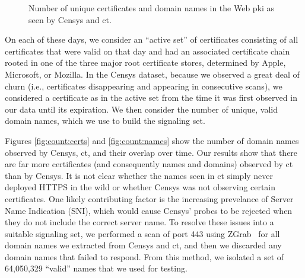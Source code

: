 \begin{figure}
  \centering
  \caption{Number of unique certificates and domain names in the Web \ac{pki} as seen by
  Censys and \ac{ct}.}
  \label{fig:count}
\end{figure}

On each of these days, we consider an ``active set'' of certificates consisting
of all certificates that were valid on that day and had an associated
certificate chain rooted in one of the three major root certificate stores,
determined by Apple, Microsoft, or Mozilla. In the Censys dataset, because we
observed a great deal of churn (i.e., certificates disappearing and appearing in
consecutive scans), we considered a certificate as in the active set from the
time it was first observed in our data until its expiration. We then consider
the number of unique, valid domain names, which we use to build the signaling
set.

Figures \autoref{fig:count:certs} and \autoref{fig:count:names} show the number of
domain names observed by Censys, \ac{ct}, and their overlap over time. Our results show that
there are far more certificates (and consequently names and domains) observed by
\ac{ct} than by Censys. It is not clear whether the names seen in \ac{ct} simply
never deployed HTTPS in the wild or whether Censys was not observing certain
certificates.  One likely contributing factor is the increasing prevelance of 
Server Name Indication (SNI), which would cause Censys' probes to be rejected
when they do not include the correct server name.
To resolve these issues into a suitable signaling set, we performed a scan of
port 443 using ZGrab~\cite{durumeric2015search} for all domain names we
extracted from Censys and \ac{ct}, and then we discarded any domain names that
failed to respond. From this method, we isolated a set of 64,050,329 ``valid''
names that we used for testing.

